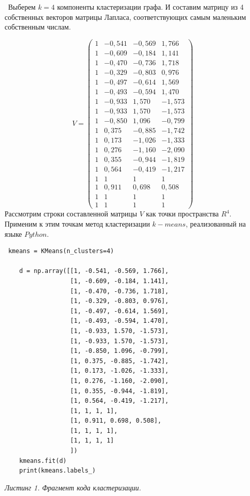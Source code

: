 \documentclass[a5paper, 10pt]{article}
\theoremstyle{definition}
\theoremstyle{plain}
\theoremstyle{remark}
\begin{document}
\newpage
\,
\newpage
Выберем $k=4$ компоненты кластеризации графа. И составим матрицу из 4 собственных векторов матрицы Лапласа, соответствующих самым маленьким собственным числам. 

\begin{equation}
V =
\left(\begin{matrix}
1 & -0,541  & -0,569 & 1,766\\
1 & -0,609 & -0,184 & 1,141\\
1 & -0,470 & -0,736 & 1,718\\
1 & -0,329 & -0,803 & 0,976\\
1 & -0,497 & -0,614 & 1,569\\
1 & -0,493 & -0,594 & 1,470\\
1 & -0,933 & 1,570 & -1,573\\
1 & -0,933 & 1,570 & -1,573\\
1 & -0,850 & 1,096 & -0,799\\
1 & 0,375 & -0,885 & -1,742\\
1 & 0,173 & -1,026 & -1,333\\
1 & 0,276 & -1,160 & -2,090\\
1 & 0,355 & -0,944 & -1,819\\
1 & 0,564 & -0,419 & -1,217\\
1 & 1 & 1 & 1\\
1 & 0,911 & 0,698 & 0,508\\
1 & 1 & 1 & 1\\
1 & 1 & 1 & 1
\end{matrix}\right)
\end{equation}
Рассмотрим строки составленной матрицы $V$ как точки пространства  $R^4$. Применим к этим точкам метод  кластеризации $k-means$, реализованный на языке $Python$.
\begin{center}
\begin{lstlisting}
 kmeans = KMeans(n_clusters=4)

    d = np.array([[1, -0.541, -0.569, 1.766],
                  [1, -0.609, -0.184, 1.141],
                  [1, -0.470, -0.736, 1.718],
                  [1, -0.329, -0.803, 0.976],
                  [1, -0.497, -0.614, 1.569],
                  [1, -0.493, -0.594, 1.470],
                  [1, -0.933, 1.570, -1.573],
                  [1, -0.933, 1.570, -1.573],
                  [1, -0.850, 1.096, -0.799],
                  [1, 0.375, -0.885, -1.742],
                  [1, 0.173, -1.026, -1.333],
                  [1, 0.276, -1.160, -2.090],
                  [1, 0.355, -0.944, -1.819],
                  [1, 0.564, -0.419, -1.217],
                  [1, 1, 1, 1],
                  [1, 0.911, 0.698, 0.508],
                  [1, 1, 1, 1],
                  [1, 1, 1, 1]
                  ])
    kmeans.fit(d)
    print(kmeans.labels_)
\end{lstlisting}
\textit{Листинг 1. Фрагмент кода кластеризации.}
\end{center}
\end{document}
